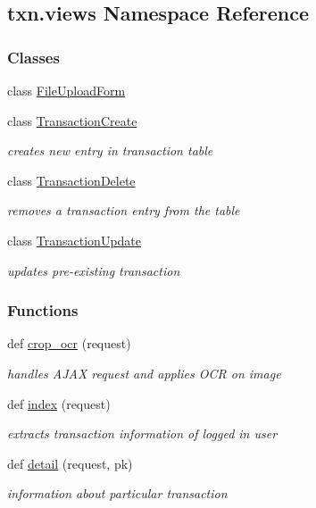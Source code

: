 \hypertarget{namespacetxn_1_1views}{}\subsection{txn.\+views Namespace Reference}
\label{namespacetxn_1_1views}
\subsubsection*{Classes}
\begin{DoxyCompactItemize}
\item 
class \hyperlink{classtxn_1_1views_1_1FileUploadForm}{File\+Upload\+Form}
\item 
class \hyperlink{classtxn_1_1views_1_1TransactionCreate}{Transaction\+Create}
\begin{DoxyCompactList}\small\item\em creates new entry in transaction table \end{DoxyCompactList}\item 
class \hyperlink{classtxn_1_1views_1_1TransactionDelete}{Transaction\+Delete}
\begin{DoxyCompactList}\small\item\em removes a transaction entry from the table \end{DoxyCompactList}\item 
class \hyperlink{classtxn_1_1views_1_1TransactionUpdate}{Transaction\+Update}
\begin{DoxyCompactList}\small\item\em updates pre-\/existing transaction \end{DoxyCompactList}\end{DoxyCompactItemize}
\subsubsection*{Functions}
\begin{DoxyCompactItemize}
\item 
def \hyperlink{namespacetxn_1_1views_ac1096b81d00047d1a39d206aae68158c}{crop\+\_\+ocr} (request)
\begin{DoxyCompactList}\small\item\em handles A\+J\+AX request and applies O\+CR on image \end{DoxyCompactList}\item 
def \hyperlink{namespacetxn_1_1views_a61ce77e1acb7dff6d535eb5df692cc15}{index} (request)
\begin{DoxyCompactList}\small\item\em extracts transaction information of logged in user \end{DoxyCompactList}\item 
def \hyperlink{namespacetxn_1_1views_a8a0b2c1194c685d03b855198044c1340}{detail} (request, pk)
\begin{DoxyCompactList}\small\item\em information about particular transaction \end{DoxyCompactList}\end{DoxyCompactItemize}


